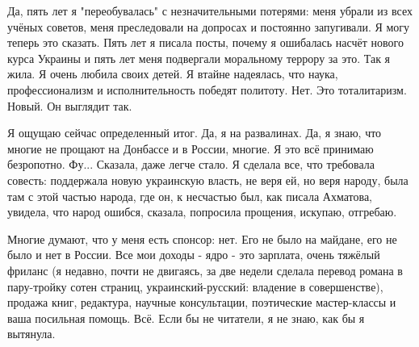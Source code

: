 Да, пять лет я "переобувалась" с незначительными потерями: меня убрали из всех
учёных советов, меня преследовали на допросах и постоянно запугивали. Я могу
теперь это сказать. Пять лет я писала посты, почему я ошибалась насчёт нового
курса Украины и пять лет меня подвергали моральному террору за это. Так я жила.
Я очень любила своих детей. Я втайне надеялась, что наука, профессионализм и
исполнительность победят политоту. Нет. Это тоталитаризм. Новый. Он выглядит
так.

Я ощущаю сейчас определенный итог. Да, я на развалинах. Да, я знаю, что многие
не прощают на Донбассе и в России, многие. Я это всё принимаю безропотно. Фу...
Сказала, даже легче стало. Я сделала все, что требовала совесть: поддержала
новую украинскую власть,  не веря ей, но веря народу, была там с этой частью
народа, где он, к несчастью был, как писала Ахматова, увидела, что народ
ошибся, сказала, попросила прощения, искупаю, отгребаю. 

Многие думают, что у меня есть спонсор: нет. Его не было на майдане, его не
было и нет в России. Все мои доходы - ядро - это зарплата, очень тяжёлый
фриланс (я недавно, почти не двигаясь, за две недели сделала перевод романа в
пару-тройку сотен страниц, украинский-русский: владение в совершенстве),
продажа книг, редактура, научные консультации, поэтические мастер-классы и ваша
посильная помощь. Всё. Если бы не читатели, я не знаю, как бы я вытянула.


